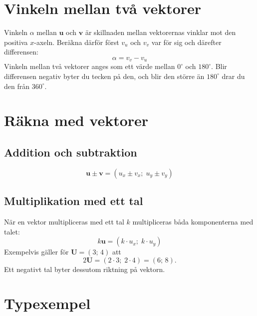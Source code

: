 \section{Vinkeln mellan två vektorer}
\label{c7:sec:vinkel}
Vinkeln $\alpha$ mellan $\mathbf{u}$ och $\mathbf{v}$ är skillnaden mellan vektorernas vinklar mot
den positiva $x$-axeln. Beräkna därför först $v_u$ och $v_v$ var för sig och därefter differensen:
\[
  \alpha = v_v - v_u
\]
Vinkeln mellan två vektorer anges som ett värde mellan $0^{\circ}$ och $180^{\circ}$. Blir
differensen negativ byter du tecken på den, och blir den större än $180^{\circ}$ drar du den från
$360^{\circ}$.

\section{Räkna med vektorer}
\label{c7:sec:rakna}

\subsection{Addition och subtraktion}
\label{c7:sec:addition}
\[
  \mathbf{u} \pm \mathbf{v} = (u_x \pm v_x;\; u_y \pm v_y)
\]

\subsection{Multiplikation med ett tal}
\label{c7:sec:multiplikation}
När en vektor multipliceras med ett tal $k$ multipliceras båda komponenterna med talet:
\[
  k\mathbf{u} = (k \cdot u_x;\; k \cdot u_y)
\]
Exempelvis gäller för $\mathbf{U} = (3;\, 4)$ att
\[
  2\mathbf{U} = (2 \cdot 3;\; 2 \cdot 4) = (6;\, 8).
\]
Ett negativt tal byter dessutom riktning på vektorn.

\section{Typexempel}
\label{c7:sec:typexempel}

